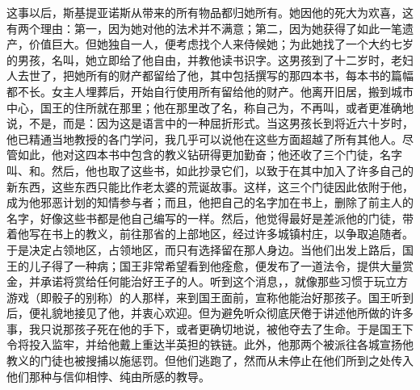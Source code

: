 这事以后，斯基提亚诺斯从带来的所有物品都归她所有。她因他的死大为欢喜，这有两个理由：第一，因为她对他的法术并不满意；第二，因为她获得了如此一笔遗产，价值巨大。但她独自一人，便考虑找个人来侍候她；为此她找了一个大约七岁的男孩，名叫，她立即给了他自由，并教他读书识字。这男孩到了十二岁时，老妇人去世了，把她所有的财产都留给了他，其中包括撰写的那四本书，每本书的篇幅都不长。女主人埋葬后，开始自行使用所有留给他的财产。他离开旧居，搬到城市中心，国王的住所就在那里；他在那里改了名，称自己为，不再叫，或者更准确地说，不是，而是：因为这是语言中的一种屈折形式。当这男孩长到将近六十岁时，他已精通当地教授的各门学问，我几乎可以说他在这些方面超越了所有其他人。尽管如此，他对这四本书中包含的教义钻研得更加勤奋；他还收了三个门徒，名字叫、和。然后，他也取了这些书，如此抄录它们，以致于在其中加入了许多自己的新东西，这些东西只能比作老太婆的荒诞故事。这样，这三个门徒因此依附于他，成为他邪恶计划的知情参与者；而且，他把自己的名字加在书上，删除了前主人的名字，好像这些书都是他自己编写的一样。然后，他觉得最好是差派他的门徒，带着他写在书上的教义，前往那省的上部地区，经过许多城镇村庄，以争取追随者。于是决定占领地区，占领地区，而只有选择留在那人身边。当他们出发上路后，国王的儿子得了一种病；国王非常希望看到他痊愈，便发布了一道法令，提供大量赏金，并承诺将赏给任何能治好王子的人。听到这个消息，，就像那些习惯于玩立方游戏（即骰子的别称）的人那样，来到国王面前，宣称他能治好那孩子。国王听到后，便礼貌地接见了他，并衷心欢迎。但为避免听众彻底厌倦于讲述他所做的许多事，我只说那孩子死在他的手下，或者更确切地说，被他夺去了生命。于是国王下令将投入监牢，并给他戴上重达半英担的铁链。此外，他那两个被派往各城宣扬他教义的门徒也被搜捕以施惩罚。但他们逃跑了，然而从未停止在他们所到之处传入他们那种与信仰相悖、纯由所感的教导。\par

